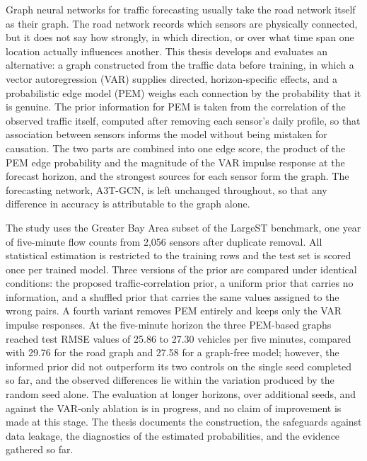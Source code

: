 \documentclass[MTech]{ugthesis}
\begin{document}
\abstract
\begin{doublespacing}
\normalfont
{\noindent Graph neural networks for traffic forecasting usually take the road network itself as their graph. The road network records which sensors are physically connected, but it does not say how strongly, in which direction, or over what time span one location actually influences another. This thesis develops and evaluates an alternative: a graph constructed from the traffic data before training, in which a vector autoregression (VAR) supplies directed, horizon-specific effects, and a probabilistic edge model (PEM) weighs each connection by the probability that it is genuine. The prior information for PEM is taken from the correlation of the observed traffic itself, computed after removing each sensor's daily profile, so that association between sensors informs the model without being mistaken for causation. The two parts are combined into one edge score, the product of the PEM edge probability and the magnitude of the VAR impulse response at the forecast horizon, and the strongest sources for each sensor form the graph. The forecasting network, A3T-GCN, is left unchanged throughout, so that any difference in accuracy is attributable to the graph alone.

The study uses the Greater Bay Area subset of the LargeST benchmark, one year of five-minute flow counts from 2,056 sensors after duplicate removal. All statistical estimation is restricted to the training rows and the test set is scored once per trained model. Three versions of the prior are compared under identical conditions: the proposed traffic-correlation prior, a uniform prior that carries no information, and a shuffled prior that carries the same values assigned to the wrong pairs. A fourth variant removes PEM entirely and keeps only the VAR impulse responses. At the five-minute horizon the three PEM-based graphs reached test RMSE values of 25.86 to 27.30 vehicles per five minutes, compared with 29.76 for the road graph and 27.58 for a graph-free model; however, the informed prior did not outperform its two controls on the single seed completed so far, and the observed differences lie within the variation produced by the random seed alone. The evaluation at longer horizons, over additional seeds, and against the VAR-only ablation is in progress, and no claim of improvement is made at this stage. The thesis documents the construction, the safeguards against data leakage, the diagnostics of the estimated probabilities, and the evidence gathered so far.}\\

\end{doublespacing}
\end{document}
